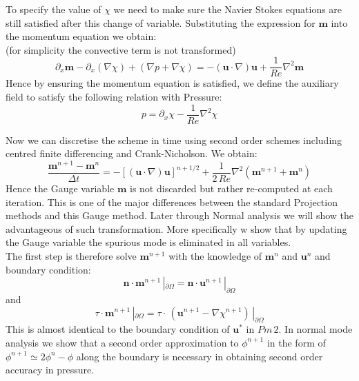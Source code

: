 To specify the value of $\chi$ we need to make sure the Navier Stokes equations are still satisfied after this change of variable. Substituting the expression for $\textbf{m}$ into the momentum equation we obtain:\\
(for simplicity the convective term is not transformed)
\begin{equation*}
\partial_x\textbf{m} - \partial_x(\nabla \chi) + \left(\nabla p + \nabla \chi\right) = -(\textbf{u} \cdot \nabla)\textbf{u} + \dfrac{1}{Re}\nabla^2\textbf{m} 
\end{equation*}
Hence by ensuring the momentum equation is satisfied, we define the auxiliary field to satisfy the following relation with Pressure:
\begin{equation*}
p = \partial_x\chi - \dfrac{1}{Re}\nabla^2\chi
\end{equation*}

Now we can discretise the scheme in time using second order schemes including centred finite differencing and Crank-Nicholson. We obtain:
\begin{equation*}
\dfrac{\textbf{m}^{n+1} - \textbf{m}^n}{\Delta t} = -\left[(\textbf{u} \cdot \nabla)\textbf{u}\right]^{n+1/2} + \dfrac{1}{2\,Re}\nabla^2\left(\textbf{m}^{n+1} + \textbf{m}^n\right)
\end{equation*}
Hence the Gauge variable $\textbf{m}$ is not discarded but rather re-computed at each iteration. This is one of the major differences between the standard Projection methods and this Gauge method. Later through Normal analysis we will show the advantageous of such transformation. More specifically w show that by updating the Gauge variable the spurious mode is eliminated in all variables.\\

The first step is therefore solve $\textbf{m}^{n+1}$ with the knowledge of $\textbf{m}^n$ and $\textbf{u}^n$ and boundary condition:
\begin{equation*}
\textbf{n}\cdot\textbf{m}^{n+1}\,|_{\partial \Omega} = \textbf{n} \cdot \textbf{u}^{n+1}\,|_{\partial \Omega}
\end{equation*}
and 
\begin{equation*}
\textbf{$\tau$}\cdot\textbf{m}^{n+1}\,|_{\partial \Omega} = \textbf{$\tau$} \cdot\,(\textbf{u}^{n+1} - \nabla \chi^{n+1})\,|_{\partial \Omega}
\end{equation*}
This is almost identical to the boundary condition of $\textbf{u}^*$ in $Pm\,2$. In normal mode analysis we show that a second order approximation to $\phi^{n+1}$ in the form of $\phi^{n+1}\simeq 2\phi^n - \phi$ along the boundary is necessary in obtaining second order accuracy in pressure.\\

